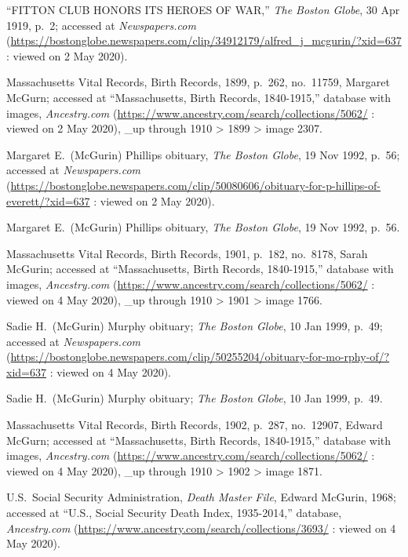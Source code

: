 \begin{thebibliography}{999}
``FITTON CLUB HONORS ITS HEROES OF WAR,'' \textit{The Boston Globe}, 30 Apr 1919, p.\ 2; accessed at \textit{Newspapers.com} (\url{https://bostonglobe.newspapers.com/clip/34912179/alfred_j_mcgurin/?xid=637} : viewed on 2 May 2020).

Massachusetts Vital Records, Birth Records, 1899, p.\ 262, no.\ 11759, Margaret McGurn; accessed at ``Massachusetts, Birth Records, 1840-1915,'' database with images, \textit{Ancestry.com} (\url{https://www.ancestry.com/search/collections/5062/} : viewed on 2 May 2020), \_up through 1910 > 1899 > image 2307.

Margaret E.\ (McGurin) Phillips obituary, \textit{The Boston Globe}, 19 Nov 1992, p.\ 56; accessed at \textit{Newspapers.com} 
(\url{https://bostonglobe.newspapers.com/clip/50080606/obituary-for-p-hillips-of-everett/?xid=637} : viewed on 2 May 2020).

Margaret E.\ (McGurin) Phillips obituary, \textit{The Boston Globe}, 19 Nov 1992, p.\ 56.

Massachusetts Vital Records, Birth Records, 1901, p.\ 182, no.\ 8178, Sarah McGurin; accessed at ``Massachusetts, Birth Records, 1840-1915,'' database with images, \textit{Ancestry.com} (\url{https://www.ancestry.com/search/collections/5062/} : viewed on 4 May 2020), \_up through 1910 > 1901 > image 1766.

Sadie H.\ (McGurin) Murphy obituary; \textit{The Boston Globe}, 10 Jan 1999, p.\ 49; accessed at \textit{Newspapers.com} (\url{https://bostonglobe.newspapers.com/clip/50255204/obituary-for-mo-rphy-of/?xid=637} : viewed on 4 May 2020).

Sadie H.\ (McGurin) Murphy obituary; \textit{The Boston Globe}, 10 Jan 1999, p.\ 49.

Massachusetts Vital Records, Birth Records, 1902, p.\ 287, no.\ 12907, Edward McGurn; accessed at ``Massachusetts, Birth Records, 1840-1915,'' database with images, \textit{Ancestry.com} (\url{https://www.ancestry.com/search/collections/5062/} : viewed on 4 May 2020), \_up through 1910 > 1902 > image 1871.

U.S.\ Social Security Administration, \textit{Death Master File}, Edward McGurin, 1968; accessed at ``U.S., Social Security Death Index, 1935-2014,'' database, \textit{Ancestry.com} (\url{https://www.ancestry.com/search/collections/3693/} : viewed on 4 May 2020).


\end{thebibliography}
